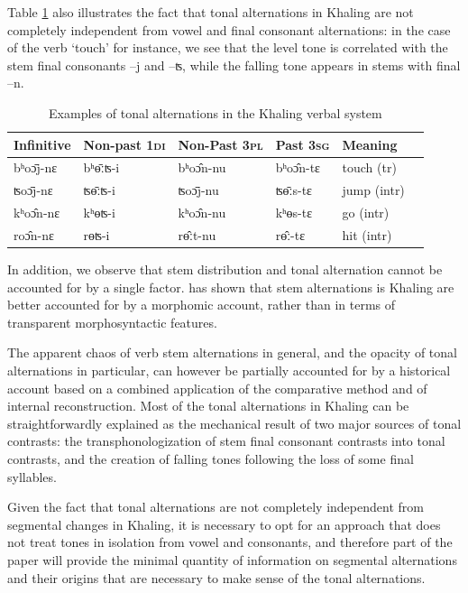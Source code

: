 \documentclass[oldfontcommands,oneside,a4paper,11pt]{article}
\newcommand{\ipa}[1]{{\phon \mbox{#1}}} %
\begin{document}
Table \ref{tab:intro} also illustrates the fact that tonal alternations in Khaling are not completely independent from vowel and final consonant alternations: in the case of the verb `touch' for instance, we see that the level tone is correlated with the stem final consonants \ipa{--j} and \ipa{--ʦ}, while the falling tone appears in stems with final \ipa{--n}.


\begin{table}[h]
\caption{Examples of tonal alternations in the Khaling verbal system} \centering \label{tab:intro}
\begin{tabular}{llllll}
\toprule
Infinitive & Non-past \textsc{1di} & Non-Past \textsc{3pl} & Past \textsc{3sg} & Meaning \\
\midrule
\ipa{bʰoɔ̄j-nɛ} &	\ipa{bʰɵ̄ːʦ-i} &	\ipa{bʰoɔ̂n-nu} &	\ipa{bʰoɔ̂n-tɛ} &	touch	(tr) \\
\ipa{ʦoɔ̄j-nɛ} &	\ipa{ʦɵ̄ːʦ-i} &	\ipa{ʦoɔ̄j-nu} &	\ipa{ʦɵ̄ːs-tɛ} &	jump	(intr) \\
\ipa{kʰoɔ̂n-nɛ} &	\ipa{kʰɵʦ-i} &	\ipa{kʰoɔ̂n-nu} &	\ipa{kʰɵs-tɛ} &	go	(intr) \\
\ipa{roɔ̂n-nɛ} &	\ipa{rɵʦ-i} &	\ipa{rɵ̂ːt-nu} &	\ipa{rɵ̂ː-tɛ} &	hit	(intr) \\
\bottomrule
\end{tabular}
\end{table}

In addition, we observe that stem distribution and tonal alternation cannot be accounted for by a single factor. \citet{walther14compactness} has shown that stem alternations is Khaling are better accounted for by a morphomic account, rather than in terms of transparent morphosyntactic features. 

The apparent chaos of verb stem alternations in general, and the opacity of tonal alternations in particular, can however be partially accounted for  by a historical account based on a combined application of the comparative method and of internal reconstruction. Most of the tonal alternations in Khaling can be straightforwardly explained as the mechanical result of two major sources of tonal contrasts: the transphonologization of stem final consonant contrasts into tonal contrasts, and the creation of falling tones following the loss of some final syllables.

Given the fact that tonal alternations are not completely independent from segmental changes in Khaling, it is necessary to opt for an approach that does not treat tones in isolation from vowel and consonants, and therefore part of the paper will provide the minimal quantity of information on segmental alternations and their origins that are necessary to make sense  of the tonal alternations.
\end{document}

